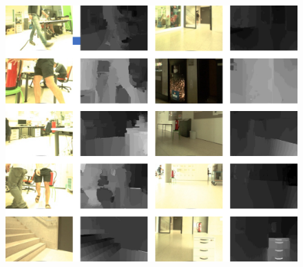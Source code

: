 \begin{figure}[h]
	\centering
	\includegraphics[scale=.4]{chapters/05_experiments/02_autonomous_walking/dataset_diversity.png}
	\caption{}
	\label{fig::523_dataset}
\end{figure}

